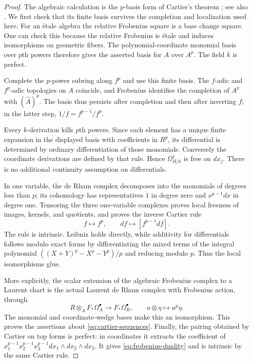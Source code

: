 \begin{proof}
The algebraic calculation is the $p$-basis form of Cartier's theorem
\cite[Theorem~1]{cartier1957}; see also
\cite[Theorem~7.2]{katz1970}.  We first check that its finite basis
survives the completion and localization used here.
For an \'{e}tale algebra the relative Frobenius square is a base
change square.  One can check this because the relative Frobenius
is \'{e}tale and induces isomorphisms on geometric fibers.
The polynomial-coordinate monomial basis over $p$th powers
therefore gives the asserted basis for $A$ over $A^p$.
The field $k$ is perfect.

Complete the $p$-power subring along $f^p$ and use this finite basis.
The $f$-adic and $f^p$-adic topologies on $A$ coincide, and Frobenius
identifies the completion of $A^p$ with $(\widehat A)^p$.
The basis thus persists after completion and then after inverting
$f$; in the latter step, $1/f=f^{p-1}/f^p$.

Every $k$-derivation kills $p$th powers.  Since each element has a
unique finite expansion in the displayed basis with coefficients
in $R^p$, its differential is determined by ordinary differentiation
of those monomials.  Conversely the coordinate derivations are
defined by that rule.  Hence $\Omega^1_{R/k}$ is free on $dx_j$.
There is no additional continuity assumption on differentials.

In one variable, the de Rham complex decomposes into the monomials
of degrees less than $p$; its cohomology has representatives $1$
in degree zero and $x^{p-1}dx$ in degree one.  Tensoring the three
one-variable complexes proves local freeness of images, kernels,
and quotients, and proves the inverse Cartier rule
\[
 f\longmapsto f^p,\qquad
 df\longmapsto[f^{p-1}df].
\]
The rule is intrinsic.  Leibniz holds directly, while additivity
for differentials follows modulo exact forms by differentiating
the mixed terms of the integral polynomial
$((X+Y)^p-X^p-Y^p)/p$ and reducing modulo $p$.
Thus the local isomorphisms glue.

More explicitly, the scalar extension of the algebraic Frobenius
complex to a Laurent chart is the actual Laurent de Rham complex
with Frobenius action, through
\[
 R\otimes_A F_*\Omega_A^\bullet\longrightarrow
 F_*\Omega_R^\bullet,
 \qquad a\otimes\eta\longmapsto a^p\eta.
\]
The monomial and coordinate-wedge bases make this an isomorphism.
This proves the assertions about \eqref{eq:cartier-sequences}.
Finally, the pairing obtained by Cartier on top forms is perfect:
in coordinates it extracts the coefficient of
$x_1^{p-1}x_2^{p-1}x_3^{p-1}dx_1\wedge dx_2\wedge dx_3$.
It gives \eqref{eq:frobenius-duality} and is intrinsic by the same
Cartier rule.
\end{proof}

